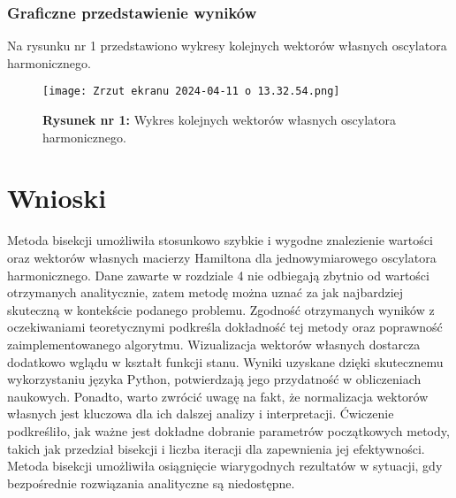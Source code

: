 \documentclass{article}
\begin{document}
\subsubsection{Graficzne przedstawienie wyników}
Na rysunku nr 1 przedstawiono wykresy kolejnych wektorów własnych oscylatora harmonicznego. 

\begin{figure}[H]
    \centering
    \texttt{[image: Zrzut ekranu 2024-04-11 o 13.32.54.png]}
    \caption*{\textbf{Rysunek nr 1:} Wykres kolejnych wektorów własnych oscylatora harmonicznego.}
    \label{fig:enter-label}
\end{figure}

\newpage
\section{Wnioski}
Metoda bisekcji umożliwiła stosunkowo szybkie i wygodne znalezienie wartości oraz wektorów własnych macierzy Hamiltona dla jednowymiarowego oscylatora harmonicznego. Dane zawarte w rozdziale 4 nie odbiegają zbytnio od wartości otrzymanych analitycznie, zatem metodę można uznać za jak najbardziej skuteczną w kontekście podanego problemu. Zgodność otrzymanych wyników z oczekiwaniami teoretycznymi podkreśla dokładność tej metody oraz poprawność zaimplementowanego algorytmu. Wizualizacja wektorów własnych dostarcza dodatkowo wglądu w kształt funkcji stanu. Wyniki uzyskane dzięki skutecznemu wykorzystaniu języka Python, potwierdzają jego przydatność w obliczeniach naukowych. Ponadto, warto zwrócić uwagę na fakt, że normalizacja wektorów własnych jest kluczowa dla ich dalszej analizy i interpretacji. Ćwiczenie podkreśliło, jak ważne jest dokładne dobranie parametrów początkowych metody, takich jak przedział bisekcji i liczba iteracji dla zapewnienia jej efektywności. Metoda bisekcji umożliwiła osiągnięcie wiarygodnych rezultatów w sytuacji, gdy bezpośrednie rozwiązania analityczne są niedostępne.
\end{document}
